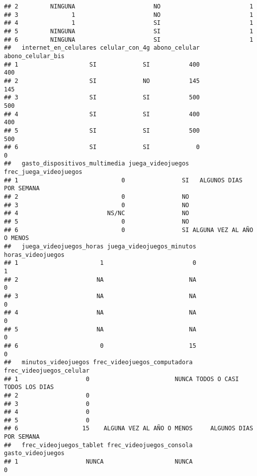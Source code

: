 \documentclass[
]{article}
\begin{document}
\begin{verbatim}
## 2         NINGUNA                      NO                         1
## 3               1                      NO                         1
## 4               1                      SI                         1
## 5         NINGUNA                      SI                         1
## 6         NINGUNA                      SI                         1
##   internet_en_celulares celular_con_4g abono_celular abono_celular_bis
## 1                    SI             SI           400               400
## 2                    SI             NO           145               145
## 3                    SI             SI           500               500
## 4                    SI             SI           400               400
## 5                    SI             SI           500               500
## 6                    SI             SI             0                 0
##   gasto_dispositivos_multimedia juega_videojuegos    frec_juega_videojuegos
## 1                             0                SI   ALGUNOS DIAS POR SEMANA
## 2                             0                NO                          
## 3                             0                NO                          
## 4                         NS/NC                NO                          
## 5                             0                NO                          
## 6                             0                SI ALGUNA VEZ AL AÑO O MENOS
##   juega_videojuegos_horas juega_videojuegos_minutos horas_videojuegos
## 1                       1                         0                 1
## 2                      NA                        NA                 0
## 3                      NA                        NA                 0
## 4                      NA                        NA                 0
## 5                      NA                        NA                 0
## 6                       0                        15                 0
##   minutos_videojuegos frec_videojuegos_computadora    frec_videojuegos_celular
## 1                   0                        NUNCA TODOS O CASI TODOS LOS DIAS
## 2                   0                                                         
## 3                   0                                                         
## 4                   0                                                         
## 5                   0                                                         
## 6                  15    ALGUNA VEZ AL AÑO O MENOS     ALGUNOS DIAS POR SEMANA
##   frec_videojuegos_tablet frec_videojuegos_consola gasto_videojuegos
## 1                   NUNCA                    NUNCA                 0

\end{verbatim}
\end{document}
